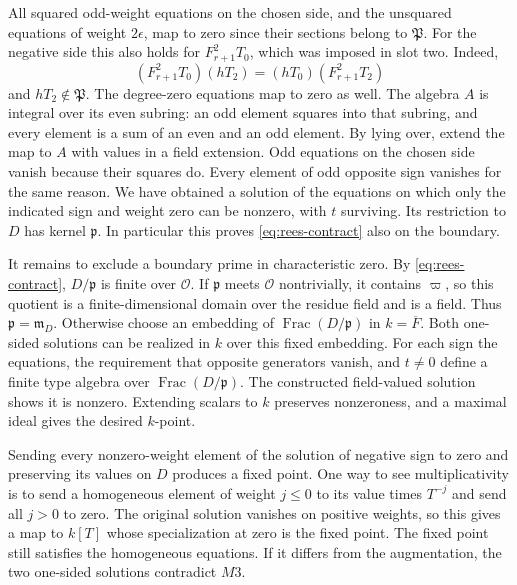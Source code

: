 All squared odd-weight equations on the chosen side, and the
unsquared equations of weight \(2\epsilon\), map to zero since their
sections belong to \(\mathfrak P\). For the negative side this also
holds for \(F_{r+1}^2T_0\), which was imposed in slot two. Indeed,
\[
        (F_{r+1}^2T_0)(hT_2)=(hT_0)(F_{r+1}^2T_2)
\]
and \(hT_2\notin\mathfrak P\). The degree-zero equations map to
zero as well. The algebra \(A\) is integral over its even subring:
an odd element squares into that subring, and every element is a
sum of an even and an odd element. By lying over, extend the map
to \(A\) with values in a field extension. Odd equations on the
chosen side vanish because their squares do. Every element of odd
opposite sign vanishes for the same reason. We have obtained a
solution of the equations on which only the indicated sign and
weight zero can be nonzero, with \(t\) surviving. Its restriction
to \(D\) has kernel \(\mathfrak p\). In particular this proves
\eqref{eq:rees-contract} also on the boundary.

It remains to exclude a boundary prime in characteristic zero.
By \eqref{eq:rees-contract}, \(D/\mathfrak p\) is finite over
\(\mathcal O\). If \(\mathfrak p\) meets \(\mathcal O\) nontrivially,
it contains \(\varpi\), so this quotient is a finite-dimensional
domain over the residue field and is a field. Thus
\(\mathfrak p=\mathfrak m_D\). Otherwise choose an embedding
of \(\operatorname{Frac}(D/\mathfrak p)\) in \(k=\overline F\).
Both one-sided solutions can be realized in \(k\) over this fixed
embedding. For each sign the equations, the requirement that
opposite generators vanish, and \(t\ne0\) define a finite type
algebra over \(\operatorname{Frac}(D/\mathfrak p)\). The constructed
field-valued solution shows it is nonzero. Extending scalars to
\(k\) preserves nonzeroness, and a maximal ideal gives the desired
\(k\)-point.

Sending every nonzero-weight element of the solution of negative
sign to zero and preserving its values on \(D\) produces a fixed
point. One way to see multiplicativity is to send a homogeneous
element of weight \(j\le0\) to its value times \(T^{-j}\) and send
all \(j>0\) to zero. The original solution vanishes on positive
weights, so this gives a map to \(k[T]\) whose specialization at
zero is the fixed point. The fixed point still satisfies the
homogeneous equations. If it differs from the augmentation, the
two one-sided solutions contradict \(M3\).

